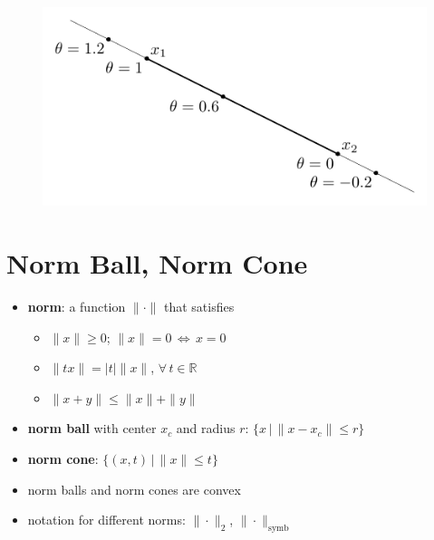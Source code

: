 \documentclass[11pt]{extarticle}
\newcommand{\ds}{\displaystyle}
\newcommand{\ifff}{\,\Longleftrightarrow\,}
\theoremstyle{definition}
\begin{document}
\begin{figure}[!htbp]
  \centering
  \includegraphics[scale=0.9,page=9]{fig/02.pdf}
\end{figure}

\newpage

\section*{Norm Ball, Norm Cone}
\begin{itemize}
  \item {\bf norm}: a function $\|\cdot\|$ that satisfies 
    \begin{itemize}
      \item $\|x\|\geqslant 0$; $\|x\| = 0\ifff x = 0$
      \item $\|tx\| = |t|\|x\|$, $\forall\,t\in\mathbb{R}$
      \item $\|x + y\|\leqslant\|x\| + \|y\|$
    \end{itemize}
  \item {\bf norm ball} with center $x_c$ and radius $r$: $\ds\{x\,|\,\|x - x_c\|\leqslant r\}$
  \item {\bf norm cone}: $\ds\{(x, t)\,|\,\|x\|\leqslant t\}$
  \item norm balls and norm cones are convex
  \item notation for different norms: $\|\cdot\|_2$, $\|\cdot\|_{\text{symb}}$
\end{itemize}


\newpage
\end{document}
